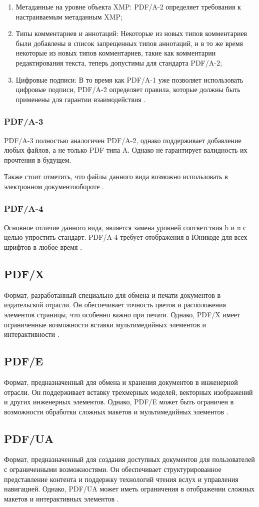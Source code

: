 \begin{enumerate}
\item Метаданные на уровне объекта XMP: PDF/A-2 определяет требования к настраиваемым метаданным XMP;
\item Типы комментариев и аннотаций: Некоторые из новых типов комментариев были добавлены в список запрещенных типов аннотаций, и в то же время некоторые из новых типов комментариев, такие как комментарии редактирования текста, теперь допустимы для стандарта PDF/A-2;
\item Цифровые подписи: В то время как PDF/A-1 уже позволяет использовать цифровые подписи, PDF/A-2 определяет правила, которые должны быть применены для гарантии взаимодействия \cite{pdf_a_2}.
\end{enumerate}
\subsubsection{PDF/A-3}
PDF/A-3 полностью аналогичен PDF/A-2, однако поддерживает добавление любых файлов, а не только PDF типа A. Однако не гарантирует валидность их прочтения в будущем.

Также стоит отметить, что файлы данного вида возможно использовать в электронном документообороте \cite{nalogi}.
\subsubsection{PDF/A-4}
Основное отличие данного вида, является замена уровней соответствия b и u с целью упростить стандарт. PDF/A-4 требует отображения в Юникоде для всех шрифтов в любое время \cite{pdf_a_4}.

\subsection{PDF/X}
Формат, разработанный специально для обмена и печати документов в издательской отрасли. Он обеспечивает точность цветов и расположения элементов страницы, что особенно важно при печати. Однако, PDF/X имеет ограниченные возможности вставки мультимедийных элементов и интерактивности \cite{abdobe_PDF}.


\subsection{PDF/E}
Формат, предназначенный для обмена и хранения документов в инженерной отрасли. Он поддерживает вставку трехмерных моделей, векторных изображений и других инженерных элементов. Однако, PDF/E может быть ограничен в возможности обработки сложных макетов и мультимедийных элементов \cite{abdobe_PDF}.
\subsection{PDF/UA}
Формат, предназначенный для создания доступных документов для пользователей с ограниченными возможностями. Он обеспечивает структурированное представление контента и поддержку технологий чтения вслух и управления навигацией. Однако, PDF/UA может иметь ограничения в отображении сложных макетов и интерактивных элементов \cite{abdobe_PDF}.




